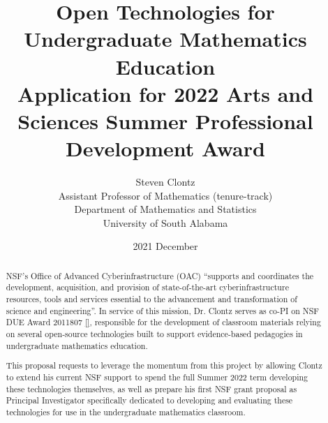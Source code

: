 \documentclass[oneside,10pt,]{article}
\title{Open Technologies for Undergraduate Mathematics Education\\
{\large Application for 2022 Arts and Sciences Summer Professional Development Award}}
\author{Steven Clontz\\
Assistant Professor of Mathematics (tenure-track)\\
Department of Mathematics and Statistics\\
University of South Alabama
}
\date{2021 December}
\newcommand{\xreffont}{\relax}
\begin{document}
\hypertarget{x:article:sabbatical-proposal}{}
\maketitle
\thispagestyle{empty}
\begin{abstract}
NSF's Office of Advanced Cyberinfrastructure (OAC) ``supports and coordinates the development, acquisition, and provision of state-of-the-art cyberinfrastructure resources, tools and services essential to the advancement and transformation of science and engineering''. In service of this mission, Dr. Clontz serves as co-PI on NSF DUE Award 2011807 \hyperlink{x:biblio:biblio-tbil-award}{[{\xreffont 17}]}, responsible for the development of classroom materials relying on several open-source technologies built to support evidence-based pedagogies in undergraduate mathematics education.%
\par
This proposal requests to leverage the momentum from this project by allowing Clontz to extend his current NSF support to spend the full Summer 2022 term developing these technologies themselves, as well as prepare his first NSF grant proposal as Principal Investigator specifically dedicated to developing and evaluating these technologies for use in the undergraduate mathematics classroom.%
\end{abstract}
\newpage
%
%
\typeout{************************************************}
\typeout{************************************************}
%
\end{document}
